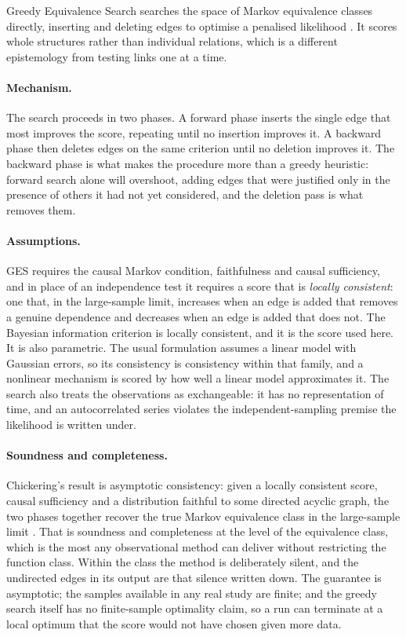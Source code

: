 Greedy Equivalence Search searches the space of Markov equivalence classes directly, inserting and deleting edges to optimise a penalised likelihood \cite{chickering2002ges}. It scores whole structures rather than individual relations, which is a different epistemology from testing links one at a time.

\paragraph{Mechanism.} The search proceeds in two phases. A forward phase inserts the single edge that most improves the score, repeating until no insertion improves it. A backward phase then deletes edges on the same criterion until no deletion improves it. The backward phase is what makes the procedure more than a greedy heuristic: forward search alone will overshoot, adding edges that were justified only in the presence of others it had not yet considered, and the deletion pass is what removes them.

\paragraph{Assumptions.} GES requires the causal Markov condition, faithfulness and causal sufficiency, and in place of an independence test it requires a score that is \emph{locally consistent}: one that, in the large-sample limit, increases when an edge is added that removes a genuine dependence and decreases when an edge is added that does not. The Bayesian information criterion is locally consistent, and it is the score used here. It is also parametric. The usual formulation assumes a linear model with Gaussian errors, so its consistency is consistency within that family, and a nonlinear mechanism is scored by how well a linear model approximates it. The search also treats the observations as exchangeable: it has no representation of time, and an autocorrelated series violates the independent-sampling premise the likelihood is written under.

\paragraph{Soundness and completeness.} Chickering's result is asymptotic consistency: given a locally consistent score, causal sufficiency and a distribution faithful to some directed acyclic graph, the two phases together recover the true Markov equivalence class in the large-sample limit \cite{chickering2002ges}. That is soundness and completeness at the level of the equivalence class, which is the most any observational method can deliver without restricting the function class. Within the class the method is deliberately silent, and the undirected edges in its output are that silence written down. The guarantee is asymptotic; the samples available in any real study are finite; and the greedy search itself has no finite-sample optimality claim, so a run can terminate at a local optimum that the score would not have chosen given more data.

